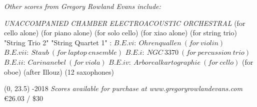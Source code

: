 \documentclass[10pt]{article}
\begin{document}

\begin{center}
\textit{\fontsize{.7cm}{1em}\selectfont Other scores from Gregory Rowland Evans include:} \hfill
\end{center}
\vspace*{4\baselineskip}
{
\begin{center}
\setlength{\columnseprule}{1pt}
\setlength{\columnsep}{6em}

\begin{paracol}{4}
\textit{\fontsize{.4cm}{1em}\selectfont UNACCOMPANIED}
\switchcolumn[1]
\textit{\fontsize{.4cm}{1em}\selectfont CHAMBER}
\switchcolumn[2]
\textit{\fontsize{.4cm}{1em}\selectfont ELECTROACOUSTIC}
\switchcolumn[3]
\textit{\fontsize{.4cm}{1em}\selectfont ORCHESTRAL}
\switchcolumn[0]
\fontsize{.1cm}{0.5em}  (for cello alone)
\switchcolumn[0]
\fontsize{.1cm}{0.5em}  (for piano alone)
\switchcolumn[0]
\fontsize{.1cm}{0.5em}  (for solo cello)
 \switchcolumn[0]
\fontsize{.1cm}{0.5em}  (for xiao alone)
\switchcolumn[1]
\fontsize{.1cm}{0.5em} 
\switchcolumn[1]
\fontsize{.1cm}{0.5em} 
\switchcolumn[1]
\fontsize{.1cm}{0.5em}  (for string trio)
\switchcolumn[1]
\fontsize{.1cm}{0.5em}  "String Trio 2"
\switchcolumn[1]
\fontsize{.1cm}{0.5em}  "String Quartet 1"
\switchcolumn[2]
\fontsize{.1cm}{0.5em} :
\switchcolumn[2]
\fontsize{.05cm}{0.5em} $B.E.vi: \ Ohrenquallen \ (for \ violin)$
\switchcolumn[2]
\fontsize{.05cm}{0.5em} $B.E.vii: \ Staub \ (for \ laptop \ ensemble)$
\switchcolumn[2]
\fontsize{.05cm}{0.5em} $B.E.i: \ NGC \ 3370 \ (for \ percussion \ trio)$
\switchcolumn[2]
\fontsize{.05cm}{0.5em} $B.E.ii: \ Carinanebel \ (for \ viola)$
\switchcolumn[2]
\fontsize{.05cm}{0.5em} $B.E.iv: \ Arborealkartographie \ (for \ cello)$
\switchcolumn[2]
\fontsize{.1cm}{0.5em}  (for oboe)
\switchcolumn[3]
\fontsize{.1cm}{0.5em} 
\switchcolumn[3]
\fontsize{.1cm}{0.5em}  (after Illouz)
\switchcolumn[3]
\fontsize{.1cm}{0.5em}  (12 saxophones)


\end{paracol}
\end{center}
}

\begin{textblock}{23}(0, 23.5)
-2018 \hfill
\textit{Scores available for purchase at www.gregoryrowlandevans.com} \hfill
\euro 26.03 / \$30
\end{textblock}
\end{document}
